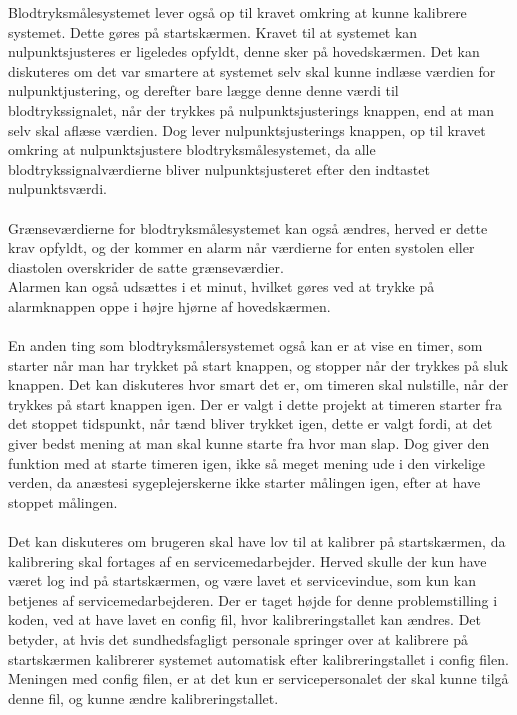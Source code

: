 Blodtryksmålesystemet lever også op til kravet omkring at kunne kalibrere systemet. Dette gøres på startskærmen. Kravet til at systemet kan nulpunktsjusteres er ligeledes opfyldt, denne sker på hovedskærmen. Det kan diskuteres om det var smartere at systemet selv skal kunne indlæse værdien for nulpunktjustering, og derefter bare lægge denne denne værdi til blodtrykssignalet, når der trykkes på nulpunktsjusterings knappen, end at man selv skal aflæse værdien. Dog lever nulpunktsjusterings knappen, op til kravet omkring at nulpunktsjustere blodtryksmålesystemet, da alle blodtrykssignalværdierne bliver nulpunktsjusteret efter den indtastet nulpunktsværdi. \\\\
Grænseværdierne for blodtryksmålesystemet kan også ændres, herved er dette krav opfyldt, og der kommer en alarm når værdierne for enten systolen eller diastolen overskrider de satte grænseværdier. \\
Alarmen kan også udsættes i et minut, hvilket gøres ved at trykke på alarmknappen oppe i højre hjørne af hovedskærmen. \\\\
En anden ting som blodtryksmålersystemet også kan er at vise en timer, som starter når man har trykket på start knappen, og stopper når der trykkes på sluk knappen. Det kan diskuteres hvor smart det er, om timeren skal nulstille, når der trykkes på start knappen igen. Der er valgt i dette projekt at timeren starter fra det stoppet tidspunkt, når tænd bliver trykket igen, dette er valgt fordi, at det giver bedst mening at man skal kunne starte fra hvor man slap. Dog giver den funktion med at starte timeren igen, ikke så meget mening ude i den virkelige verden, da anæstesi sygeplejerskerne ikke starter målingen igen, efter at have stoppet målingen. \\\\
Det kan diskuteres om brugeren skal have lov til at kalibrer på startskærmen, da kalibrering skal fortages af en servicemedarbejder. Herved skulle der kun have været log ind på startskærmen, og være lavet et servicevindue, som kun kan betjenes af servicemedarbejderen. Der er taget højde for denne problemstilling i koden, ved at have lavet en config fil, hvor kalibreringstallet kan ændres. Det betyder, at hvis det sundhedsfagligt personale springer over at kalibrere på startskærmen kalibrerer systemet automatisk efter kalibreringstallet i config filen. Meningen med config filen, er at det kun er servicepersonalet der skal kunne tilgå denne fil, og kunne ændre kalibreringstallet. 
